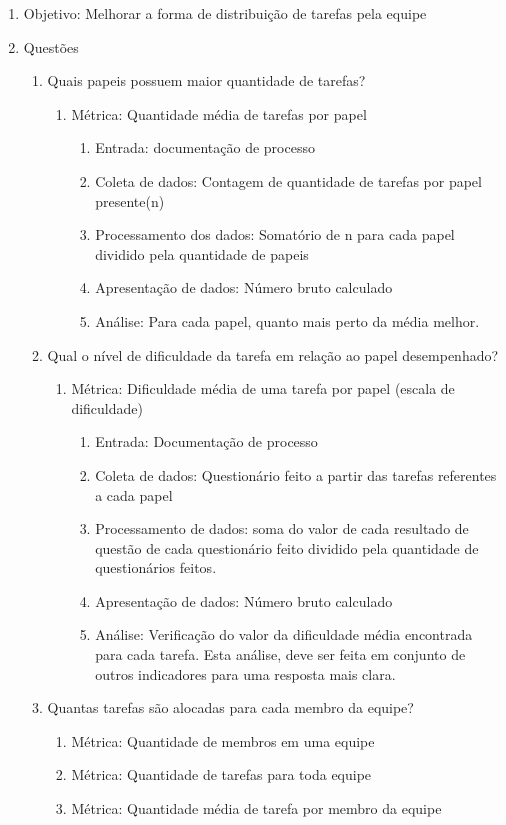 \documentclass{article}
\begin{document}
	\begin{enumerate}
	\item Objetivo: Melhorar a forma de distribuição de tarefas pela equipe
	\item Questões
		\begin{enumerate}
		\item Quais papeis possuem maior quantidade de tarefas?
			\begin{enumerate}
			\item Métrica: Quantidade média de tarefas por papel
				\begin{enumerate}
				
				\item Entrada: documentação de processo
				\item Coleta de dados: Contagem de quantidade de tarefas por papel presente(n)
				\item Processamento dos dados: Somatório de n para cada papel dividido pela quantidade de papeis
				\item Apresentação de dados: Número bruto calculado
				\item Análise: Para cada papel, quanto mais perto da média melhor.
				
				\end{enumerate}
			\end{enumerate}
		\item Qual o nível de dificuldade da tarefa em relação ao papel desempenhado?
			\begin{enumerate}
			\item Métrica: Dificuldade média de uma tarefa por papel (escala de dificuldade)
				\begin{enumerate}
				\item Entrada: Documentação de processo
				\item Coleta de dados: Questionário feito a partir das tarefas referentes a cada papel
				\item Processamento de dados: soma do valor de cada resultado de questão de cada questionário feito dividido pela quantidade de questionários feitos.
				\item Apresentação de dados: Número bruto calculado
				\item Análise: Verificação do valor da dificuldade média encontrada para cada tarefa. Esta análise, deve ser feita em conjunto de outros indicadores para uma resposta mais clara.
				  
				\end{enumerate}
			\end{enumerate}
		\item Quantas tarefas são alocadas para cada membro da equipe?
			\begin{enumerate}
			\item Métrica: Quantidade de membros em uma equipe
			\item Métrica: Quantidade de tarefas para toda equipe
			\item Métrica: Quantidade média de tarefa por membro da equipe
			\end{enumerate}
		\end{enumerate}
	\end{enumerate}
	
\end{document}
